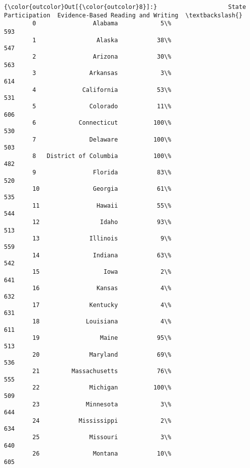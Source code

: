 \documentclass[11pt]{article}
\begin{document}
\begin{Verbatim}[commandchars=\\\{\}]
{\color{outcolor}Out[{\color{outcolor}8}]:}                    State Participation  Evidence-Based Reading and Writing  \textbackslash{}
        0                Alabama            5\%                                 593   
        1                 Alaska           38\%                                 547   
        2                Arizona           30\%                                 563   
        3               Arkansas            3\%                                 614   
        4             California           53\%                                 531   
        5               Colorado           11\%                                 606   
        6            Connecticut          100\%                                 530   
        7               Delaware          100\%                                 503   
        8   District of Columbia          100\%                                 482   
        9                Florida           83\%                                 520   
        10               Georgia           61\%                                 535   
        11                Hawaii           55\%                                 544   
        12                 Idaho           93\%                                 513   
        13              Illinois            9\%                                 559   
        14               Indiana           63\%                                 542   
        15                  Iowa            2\%                                 641   
        16                Kansas            4\%                                 632   
        17              Kentucky            4\%                                 631   
        18             Louisiana            4\%                                 611   
        19                 Maine           95\%                                 513   
        20              Maryland           69\%                                 536   
        21         Massachusetts           76\%                                 555   
        22              Michigan          100\%                                 509   
        23             Minnesota            3\%                                 644   
        24           Mississippi            2\%                                 634   
        25              Missouri            3\%                                 640   
        26               Montana           10\%                                 605   

\end{Verbatim}
\end{document}
